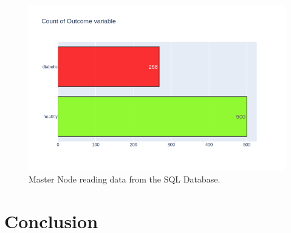 \documentclass[12pt]{article}
\begin{document}
\begin{figure}[ht]
\centering
\includegraphics[width=1\textwidth]{newplot.png}
\caption{Master Node reading data from the SQL Database.}
\end{figure}
\clearpage
\newpage
\section{Conclusion}
\newpage


\end{document}
